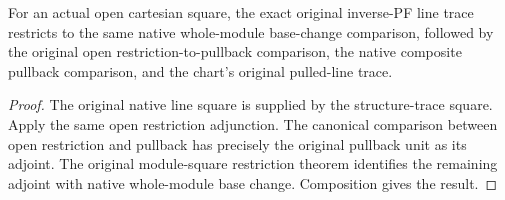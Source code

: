 \begin{lemma}
\label{lem:kn-original-line-trace-native-open-restriction}
\leanok
For an actual open cartesian square, the exact original inverse-PF line trace
restricts to the same native whole-module base-change comparison, followed by
the original open restriction-to-pullback comparison, the native composite
pullback comparison, and the chart's original pulled-line trace.
\end{lemma}
\begin{proof}
The original native line square is supplied by the structure-trace square.
Apply the same open restriction adjunction. The canonical comparison between
open restriction and pullback has precisely the original pullback unit as its
adjoint. The original module-square restriction theorem identifies the remaining
adjoint with native whole-module base change. Composition gives the result.
\end{proof}
